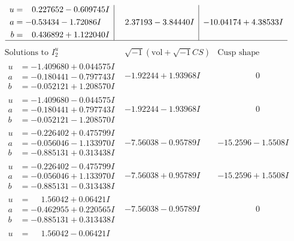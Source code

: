 \documentclass[1p]{elsarticle_modified}
\theoremstyle{definition}
\newcommand{\I}{\sqrt{-1}}
\begin{document}
$$\begin{array}{c|c|c}
\begin{aligned}
u &= \phantom{-}0.227652 - 0.609745 I \\
a &= -0.53434 - 1.72086 I \\
b &= \phantom{-}0.436892 + 1.122040 I\end{aligned}
 & \phantom{-}2.37193 - 3.84440 I & -10.04174 + 4.38533 I\\
 \hline 
 \end{array}$$\newpage$$\begin{array}{c|c|c}  
\text{Solutions to }I^u_{2}& \I (\text{vol} + \sqrt{-1}CS) & \text{Cusp shape}\\
 \hline 
\begin{aligned}
u &= -1.409680 + 0.044575 I \\
a &= -0.180441 - 0.797743 I \\
b &= -0.052121 + 1.208570 I\end{aligned}
 & -1.92244 + 1.93968 I & \phantom{-0.000000 } 0 \\ \hline\begin{aligned}
u &= -1.409680 - 0.044575 I \\
a &= -0.180441 + 0.797743 I \\
b &= -0.052121 - 1.208570 I\end{aligned}
 & -1.92244 - 1.93968 I & \phantom{-0.000000 } 0 \\ \hline\begin{aligned}
u &= -0.226402 + 0.475799 I \\
a &= -0.056046 - 1.133970 I \\
b &= -0.885131 + 0.313438 I\end{aligned}
 & -7.56038 - 0.95789 I & -15.2596 - 1.5508 I \\ \hline\begin{aligned}
u &= -0.226402 - 0.475799 I \\
a &= -0.056046 + 1.133970 I \\
b &= -0.885131 - 0.313438 I\end{aligned}
 & -7.56038 + 0.95789 I & -15.2596 + 1.5508 I \\ \hline\begin{aligned}
u &= \phantom{-}1.56042 + 0.06421 I \\
a &= -0.462955 + 0.220565 I \\
b &= -0.885131 + 0.313438 I\end{aligned}
 & -7.56038 - 0.95789 I & \phantom{-0.000000 } 0 \\ \hline\begin{aligned}
u &= \phantom{-}1.56042 - 0.06421 I \\

\end{aligned}
\end{array}$$
\end{document}
